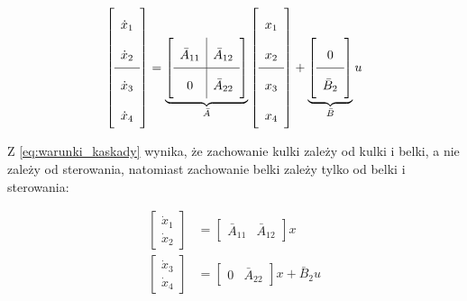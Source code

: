 \begin{equation}
    \left[
    \begin{array}{c}
        \dot{x}_1 \\
        \dot{x}_2 \\
        \hline
        \dot{x}_3 \\
        \dot{x}_4
    \end{array}
    \right]
    =
    \underbrace{
        \renewcommand\arraystretch{2}
        \left[
        \begin{array}{c|c}
           \bar{A}_{11} & \bar{A}_{12} \\
           \hline
           0 & \bar{A}_{22}
        \end{array}
        \right]
    }_{\bar{A}}
    \left[
    \begin{array}{c}
        x_1 \\
        x_2 \\
        \hline
        x_3 \\
        x_4 \\
    \end{array}
    \right]
    +
    \underbrace{
        \renewcommand\arraystretch{2}
        \left[
        \begin{array}{c}
        0 \\
        \hline
        \bar{B}_2
        \end{array}
        \right]
    }_{\bar{B}}
    u \label{eq:warunki_kaskady}
\end{equation}

Z \eqref{eq:warunki_kaskady} wynika, że zachowanie kulki zależy od kulki i belki, a nie zależy od sterowania, natomiast zachowanie belki zależy tylko od belki i sterowania:

\begin{align*}
    \begin{bmatrix}
        \dot{x}_1 \\ \dot{x}_2
    \end{bmatrix}
    &= \begin{bmatrix}
    \bar{A}_{11} & \bar{A}_{12}
    \end{bmatrix} x \\
    \begin{bmatrix}
    \dot{x}_3 \\ \dot{x}_4
    \end{bmatrix}
    &= \begin{bmatrix}
    0 & \bar{A}_{22}
    \end{bmatrix} x
    + \bar{B}_2 u
\end{align*}

